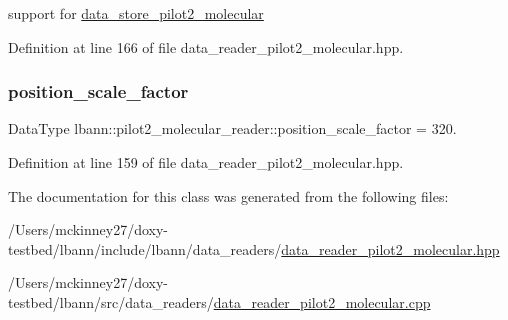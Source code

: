 support for \hyperlink{classlbann_1_1data__store__pilot2__molecular}{data\+\_\+store\+\_\+pilot2\+\_\+molecular} 



Definition at line 166 of file data\+\_\+reader\+\_\+pilot2\+\_\+molecular.\+hpp.

\mbox{\label{classlbann_1_1pilot2__molecular__reader_a0f85cc2fc807d8c7dc6fb4f93db5e09a}} 
\subsubsection{\texorpdfstring{position\+\_\+scale\+\_\+factor}{position\_scale\_factor}}
{\footnotesize\ttfamily Data\+Type lbann\+::pilot2\+\_\+molecular\+\_\+reader\+::position\+\_\+scale\+\_\+factor = 320.\hspace{0.3cm}{\ttfamily [protected]}}



Definition at line 159 of file data\+\_\+reader\+\_\+pilot2\+\_\+molecular.\+hpp.



The documentation for this class was generated from the following files\+:\begin{DoxyCompactItemize}
\item 
/\+Users/mckinney27/doxy-\/testbed/lbann/include/lbann/data\+\_\+readers/\hyperlink{data__reader__pilot2__molecular_8hpp}{data\+\_\+reader\+\_\+pilot2\+\_\+molecular.\+hpp}\item 
/\+Users/mckinney27/doxy-\/testbed/lbann/src/data\+\_\+readers/\hyperlink{data__reader__pilot2__molecular_8cpp}{data\+\_\+reader\+\_\+pilot2\+\_\+molecular.\+cpp}\end{DoxyCompactItemize}
